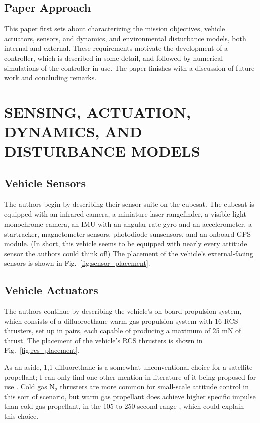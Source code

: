 \documentclass[letterpaper, 11 pt, conference]{ieeeconf}  %
\begin{document}
\subsection{Paper Approach}

This paper first sets about characterizing the mission objectives, vehicle actuators, sensors, and dynamics, and environmental disturbance models, both internal and external. These requirements motivate the development of a controller, which is described in some detail, and followed by numerical simulations of the controller in use. The paper finishes with a discussion of future work and concluding remarks.

\section{SENSING, ACTUATION, DYNAMICS, AND DISTURBANCE MODELS}

\subsection{Vehicle Sensors}

The authors begin by describing their sensor suite on the cubesat. The cubesat is equipped with an infrared camera, a miniature laser rangefinder, a visible light monochrome camera, an IMU with an angular rate gyro and an accelerometer, a startracker, magnetometer sensors, photodiode sunsensors, and an onboard GPS module. (In short, this vehicle seems to be equipped with nearly every attitude sensor the authors could think of!) The placement of the vehicle's external-facing sensors is shown in Fig.~\ref{fig:sensor_placement}.

\subsection{Vehicle Actuators}

The authors continue by describing the vehicle's on-board propulsion system, which consists of a difluoroethane warm gas propulsion system with 16 RCS thrusters, set up in pairs, each capable of producing a maximum of 25 mN of thrust. The placement of the vehicle's RCS thrusters is shown in Fig.~\ref{fig:rcs_placement}.

As an aside, 1,1-difluorethane is a somewhat unconventional choice for a satellite propellant; I can only find one other mention in literature of it being proposed for use \cite{bogdan}. Cold gas N$_{2}$ thrusters are more common for small-scale attitude control in this sort of scenario, but warm gas propellant does achieve higher specific impulse than cold gas propellant, in the 105 to 250 second range \cite{rpe}, which could explain this choice.
\end{document}
